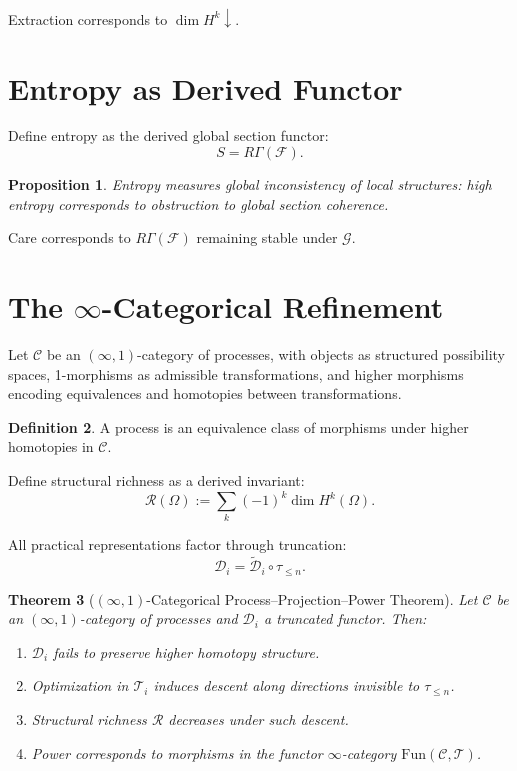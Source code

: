 \documentclass[11pt,a4paper]{article}
\newtheorem{theorem}{Theorem}[section]
\newtheorem{proposition}[theorem]{Proposition}
\theoremstyle{definition}
\newtheorem{definition}[theorem]{Definition}
\theoremstyle{remark}
\begin{document}
Extraction corresponds to $\dim H^k \downarrow$.

\section{Entropy as Derived Functor}

Define entropy as the derived global section functor:
\[
S = R\Gamma(\mathcal{F}).
\]

\begin{proposition}
Entropy measures global inconsistency of local structures: high entropy corresponds to obstruction to global section coherence.
\end{proposition}

Care corresponds to $R\Gamma(\mathcal{F})$ remaining stable under $\mathcal{G}$.

\section{The $\infty$-Categorical Refinement}

Let $\mathcal{C}$ be an $(\infty,1)$-category of processes, with objects as structured possibility spaces, 1-morphisms as admissible transformations, and higher morphisms encoding equivalences and homotopies between transformations.

\begin{definition}
A process is an equivalence class of morphisms under higher homotopies in $\mathcal{C}$.
\end{definition}

Define structural richness as a derived invariant:
\[
\mathcal{R}(\Omega) := \sum_k (-1)^k \dim H^k(\Omega).
\]

All practical representations factor through truncation:
\[
\mathcal{D}_i = \tilde{\mathcal{D}}_i \circ \tau_{\leq n}.
\]

\begin{theorem}[$(\infty,1)$-Categorical Process--Projection--Power Theorem]
Let $\mathcal{C}$ be an $(\infty,1)$-category of processes and $\mathcal{D}_i$ a truncated functor. Then:
\begin{enumerate}
\item $\mathcal{D}_i$ fails to preserve higher homotopy structure.
\item Optimization in $\mathcal{T}_i$ induces descent along directions invisible to $\tau_{\leq n}$.
\item Structural richness $\mathcal{R}$ decreases under such descent.
\item Power corresponds to morphisms in the functor $\infty$-category $\mathrm{Fun}(\mathcal{C}, \mathcal{T})$.
\end{enumerate}
\end{theorem}
\end{document}
